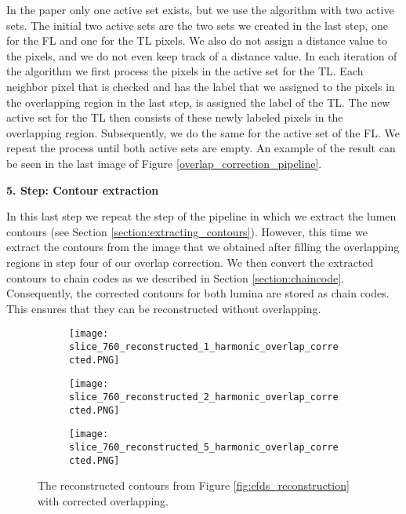 \documentclass[thesis.tex]{subfiles}
\begin{document}
In the paper only one active set exists, but we use the algorithm with two active sets. The initial two active sets are the two sets we created in the last step, one for the FL and one for the TL pixels. We also do not assign a distance value to the pixels, and we do not even keep track of a distance value. In each iteration of the algorithm we first process the pixels in the active set for the TL. Each neighbor pixel that is checked and has the label that we assigned to the pixels in the overlapping region in the last step, is assigned the label of the TL. The new active set for the TL then consists of these newly labeled pixels in the overlapping region. Subsequently, we do the same for the active set of the FL. We repeat the process until both active sets are empty. An example of the result can be seen in the last image of Figure \ref{overlap_correction_pipeline}.  

\textbf{5. Step: Contour extraction}

In this last step we repeat the step of the pipeline in which we extract the lumen contours (see Section \ref{section:extracting_contours}). However, this time we extract the contours from the image that we obtained after filling the overlapping regions in step four of our overlap correction. We then convert the extracted contours to chain codes as we described in Section \ref{section:chaincode}. Consequently, the corrected contours for both lumina are stored as chain codes. This ensures that they can be reconstructed without overlapping. 

\begin{figure}
	\begin{subfigure}[t]{0.45\textwidth}
		\texttt{[image: slice\_760\_reconstructed\_1\_harmonic\_overlap\_corrected.PNG]}
	\caption{}		
	\end{subfigure}
\hspace{0.05\textwidth}
	\begin{subfigure}[t]{0.45\textwidth}
		\texttt{[image: slice\_760\_reconstructed\_2\_harmonic\_overlap\_corrected.PNG]}		
\caption{}	
	\end{subfigure}
\centering
\begin{subfigure}[t]{0.45\textwidth}
		\texttt{[image: slice\_760\_reconstructed\_5\_harmonic\_overlap\_corrected.PNG]}		
\caption{}	
	\end{subfigure}
	\caption{The reconstructed contours from Figure \ref{fig:efds_reconstruction} with corrected overlapping.}
\label{fig:obliqueslices}
\end{figure}   
\end{document}
